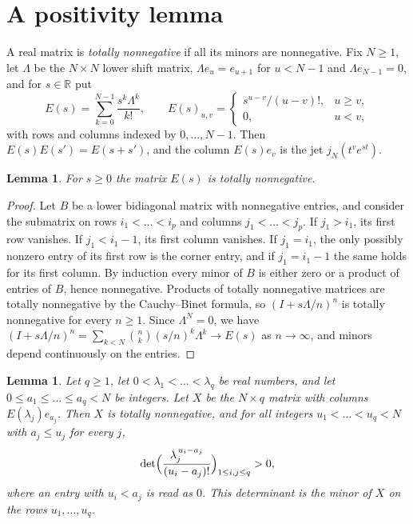 \documentclass{amsart}
\newtheorem{lemma}[theorem]{Lemma}
\theoremstyle{definition}
\numberwithin{equation}{section}
\newcommand{\R}{\mathbb{R}}
\begin{document}
\section{A positivity lemma}\label{sec:TP}

A real matrix is \emph{totally nonnegative} if all its minors are nonnegative.
Fix $N\ge1$, let $\Lambda$ be the $N\times N$ lower shift matrix,
$\Lambda e_u=e_{u+1}$ for $u<N-1$ and $\Lambda e_{N-1}=0$, and for $s\in\R$ put
\[
  E(s)=\sum_{k=0}^{N-1}\frac{s^k\Lambda^k}{k!},
  \qquad
  E(s)_{u,v}=
  \begin{cases}
    s^{u-v}/(u-v)!, & u\ge v,\\
    0, & u<v,
  \end{cases}
\]
with rows and columns indexed by $0,\dots,N-1$. Then $E(s)E(s')=E(s+s')$, and
the column $E(s)e_v$ is the jet $j_N(t^ve^{st})$.

\begin{lemma}\label{lem:Etn}
For $s\ge0$ the matrix $E(s)$ is totally nonnegative.
\end{lemma}

\begin{proof}
Let $B$ be a lower bidiagonal matrix with nonnegative entries, and consider the
submatrix on rows $i_1<\dots<i_p$ and columns $j_1<\dots<j_p$. If $j_1>i_1$, its
first row vanishes. If $j_1<i_1-1$, its first column vanishes. If $j_1=i_1$,
the only possibly nonzero entry of its first row is the corner entry, and if
$j_1=i_1-1$ the same holds for its first column. By induction every minor of
$B$ is either zero or a product of entries of $B$, hence nonnegative. Products
of totally nonnegative matrices are totally nonnegative by the Cauchy--Binet
formula, so $(I+s\Lambda/n)^n$ is totally nonnegative for every $n\ge1$. Since
$\Lambda^N=0$, we have $(I+s\Lambda/n)^n=\sum_{k<N}\binom nk(s/n)^k\Lambda^k\to
E(s)$ as $n\to\infty$, and minors depend continuously on the entries.
\end{proof}

\begin{lemma}\label{lem:TP}
Let $q\ge1$, let $0<\lambda_1<\dots<\lambda_q$ be real numbers, and let
$0\le a_1\le\dots\le a_q<N$ be integers. Let $X$ be the $N\times q$ matrix with
columns $E(\lambda_j)e_{a_j}$. Then $X$ is totally nonnegative, and for all
integers $u_1<\dots<u_q<N$ with $a_j\le u_j$ for every $j$,
\[
  \det\Bigl(\frac{\lambda_j^{\,u_i-a_j}}{(u_i-a_j)!}\Bigr)_{1\le i,j\le q}>0,
\]
where an entry with $u_i<a_j$ is read as $0$. This determinant is the minor of
$X$ on the rows $u_1,\dots,u_q$.
\end{lemma}
\end{document}
